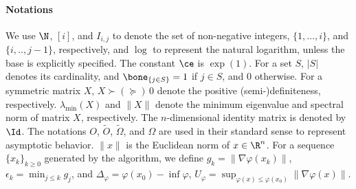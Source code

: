 \paragraph{Notations}
We use $\N$, $[i]$, and $I_{i,j}$ to denote the set of non-negative integers, $\{1,\ldots,i\}$, and $\{i, .., j-1\}$, respectively, and $\log$ to represent the natural logarithm, unless the base is explicitly specified.
The constant $\ce$ is $\exp(1)$.
For a set $S$, $|S|$ denotes its cardinality, and $\bone_{\{j \in S\}} = 1$ if $j \in S$, and $0$ otherwise. For a symmetric matrix $X$, $X\succ (\succeq)\,0$ denote the positive (semi-)definiteness, respectively. $\lambda_{\min}(X)$ and $\|X\|$ denote the minimum eigenvalue and spectral norm of matrix $X$, respectively. 
The $n$-dimensional identity matrix is denoted by $\Id$.
The notations $O$, $\tilde O$, $\tilde \Omega$, and $\Omega$ are used in their standard sense to represent asymptotic behavior.
$\|x\|$ is the Euclidean norm of $x\in\R^n$.
For a sequence $\{x_k\}_{k \geq 0}$ generated by the algorithm,
we define $g_k = \| \nabla \varphi(x_k) \|$, $\epsilon_k = \min_{j \leq k} g_j$, %
and $\Delta_\varphi = \varphi(x_0) - \inf \varphi$, $U_\varphi = \sup_{\varphi(x) \leq \varphi(x_0)} \| \nabla \varphi(x) \|$.

